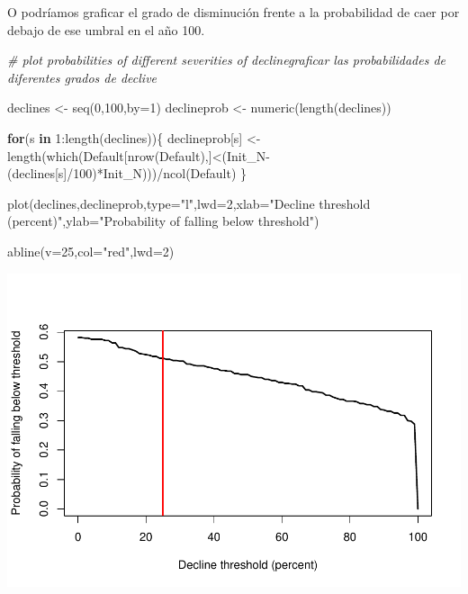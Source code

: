 \documentclass[
]{article}
\newenvironment{Shaded}{\begin{snugshade}}{\end{snugshade}}
\newcommand{\AttributeTok}[1]{\textcolor[rgb]{0.77,0.63,0.00}{#1}}
\newcommand{\CommentTok}[1]{\textcolor[rgb]{0.56,0.35,0.01}{\textit{#1}}}
\newcommand{\ControlFlowTok}[1]{\textcolor[rgb]{0.13,0.29,0.53}{\textbf{#1}}}
\newcommand{\DecValTok}[1]{\textcolor[rgb]{0.00,0.00,0.81}{#1}}
\newcommand{\FunctionTok}[1]{\textcolor[rgb]{0.00,0.00,0.00}{#1}}
\newcommand{\NormalTok}[1]{#1}
\newcommand{\OtherTok}[1]{\textcolor[rgb]{0.56,0.35,0.01}{#1}}
\newcommand{\SpecialCharTok}[1]{\textcolor[rgb]{0.00,0.00,0.00}{#1}}
\newcommand{\StringTok}[1]{\textcolor[rgb]{0.31,0.60,0.02}{#1}}
\begin{document}
O podríamos graficar el grado de disminución frente a la probabilidad de
caer por debajo de ese umbral en el año 100.

\begin{Shaded}
\begin{Highlighting}[]
\CommentTok{\# plot probabilities of different severities of declinegraficar las probabilidades de diferentes grados de declive}

\NormalTok{declines }\OtherTok{\textless{}{-}} \FunctionTok{seq}\NormalTok{(}\DecValTok{0}\NormalTok{,}\DecValTok{100}\NormalTok{,}\AttributeTok{by=}\DecValTok{1}\NormalTok{)}
\NormalTok{declineprob }\OtherTok{\textless{}{-}} \FunctionTok{numeric}\NormalTok{(}\FunctionTok{length}\NormalTok{(declines))}

\ControlFlowTok{for}\NormalTok{(s }\ControlFlowTok{in} \DecValTok{1}\SpecialCharTok{:}\FunctionTok{length}\NormalTok{(declines))\{}
\NormalTok{  declineprob[s] }\OtherTok{\textless{}{-}} \FunctionTok{length}\NormalTok{(}\FunctionTok{which}\NormalTok{(Default[}\FunctionTok{nrow}\NormalTok{(Default),]}\SpecialCharTok{\textless{}}\NormalTok{(Init\_N}\SpecialCharTok{{-}}\NormalTok{(declines[s]}\SpecialCharTok{/}\DecValTok{100}\NormalTok{)}\SpecialCharTok{*}\NormalTok{Init\_N)))}\SpecialCharTok{/}\FunctionTok{ncol}\NormalTok{(Default)}
\NormalTok{\}}

\FunctionTok{plot}\NormalTok{(declines,declineprob,}\AttributeTok{type=}\StringTok{"l"}\NormalTok{,}\AttributeTok{lwd=}\DecValTok{2}\NormalTok{,}\AttributeTok{xlab=}\StringTok{"Decline threshold (percent)"}\NormalTok{,}\AttributeTok{ylab=}\StringTok{"Probability of falling below threshold"}\NormalTok{)}

\FunctionTok{abline}\NormalTok{(}\AttributeTok{v=}\DecValTok{25}\NormalTok{,}\AttributeTok{col=}\StringTok{"red"}\NormalTok{,}\AttributeTok{lwd=}\DecValTok{2}\NormalTok{)}
\end{Highlighting}
\end{Shaded}

\includegraphics{LECTURE12_files/figure-latex/unnamed-chunk-8-1.pdf}
\end{document}
